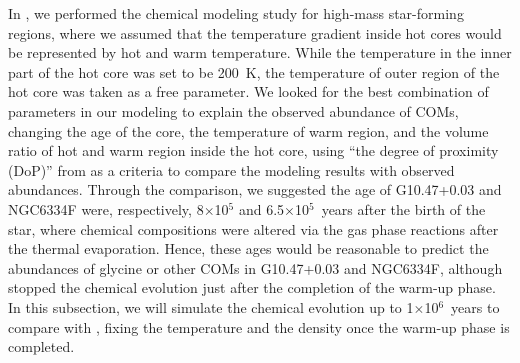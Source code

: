 \documentclass{aastex61}
\begin{document}
In \cite{Suzuki17}, we performed the chemical modeling study for high-mass star-forming regions, where we assumed that the temperature gradient inside hot cores would be represented by hot and warm temperature.
%
%
While the temperature in the inner part of the hot core was set to be 200~K, the temperature of outer region of the hot core was taken as a free parameter.
%
We looked for the best combination of parameters in our modeling to explain the observed abundance of COMs, changing the age of the core, the temperature of warm region, and the volume ratio of hot and warm region inside the hot core, using ``the degree of proximity (DoP)'' from \cite{Wakelam06} as a criteria to compare the modeling results with observed abundances.
%
Through the comparison, we suggested the age of G10.47+0.03 and NGC6334F were, respectively, 8$\times$10$^{5}$ and 6.5$\times$10$^{5}$~years after the birth of the star, where chemical compositions were altered via the gas phase reactions after the thermal evaporation.
%
Hence, these ages would be reasonable to predict the abundances of glycine or other COMs in G10.47+0.03 and NGC6334F, although \cite{Garrod13} stopped the chemical evolution just after the completion of the warm-up phase.
%
%
In this subsection, we will simulate the chemical evolution up to 1$\times$10$^6$~years to compare with \cite{Suzuki17}, fixing the temperature and the density once the warm-up phase is completed.
\end{document}
